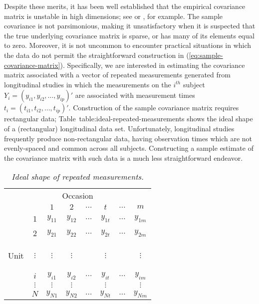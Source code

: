 Despite these merits, it has been well established that the empirical covariance matrix is unstable in high dimensions; see \cite{lin1985monte} or \cite{johnstone2001distribution}, for example. The sample covariance is not parsimonious, making it unsatisfactory when it is suspected that the true underlying covariance matrix is sparse, or has many of its elements equal to zero. Moreover, it is not uncommon to encounter practical situations in which the data do not permit the straightforward construction in (\ref{eq:sample-covariance-matrix}). Specifically, we are interested in estimating the covariance matrix associated with a vector of repeated measurements generated from longitudinal studies in which the measurements on the $i^{th}$ subject $Y_i = \left(y_{i1}, y_{i2}, \dots, y_{ip}\right)'$ are associated with measurement times $t_i = \left(t_{i1}, t_{i2}, \dots, t_{ip}\right)'$. Construction of the sample covariance matrix requires rectangular data; Table~{table:ideal-repeated-measurements} shows the ideal shape of a (rectangular) longitudinal data set. Unfortunately, longitudinal studies frequently produce non-rectangular data, having observation times which are not evenly-spaced and common across all subjects. Constructing a sample estimate of the covariance matrix with such data is a much less straightforward endeavor. 

\bigskip

\begin{table}[H] 
\centering
\caption{\textit{Ideal shape of repeated measurements.}}
\begin{tabular}{cc|cccccc}
\multicolumn{8}{c}{Occasion}\\
& & $1$&$2$ &  $\dots$ & $t$ & $\dots$ & $m$ \\ \midrule
& 1 & $y_{11}$&$y_{12}$ &$\dots$ & $y_{1t}$ & $\dots$& $y_{1m}$ \\
& 2 & $y_{21}$&$y_{22}$ &$\dots$ & $y_{2t}$ & $\dots$& $y_{2m}$ \\
\begin{rotate}{90}%
\mbox{Unit}\end{rotate} & $\vdots$ &$\vdots$&$\vdots$ & &$\vdots$ & & $\vdots$ \\
& $i$ & $y_{i1}$&$y_{i2}$ &$\dots$ & $y_{it}$ & $\dots$& $y_{im}$ \\
 & $\vdots$ &$\vdots$&$\vdots$ & &$\vdots$ & & $\vdots$ \\
 & $N$ & $y_{N1}$&$y_{N2}$ &$\dots$ & $y_{Nt}$ & $\dots$& $y_{Nm}$ \\
\end{tabular} \label{table:ideal-repeated-measurements}
\end{table}

